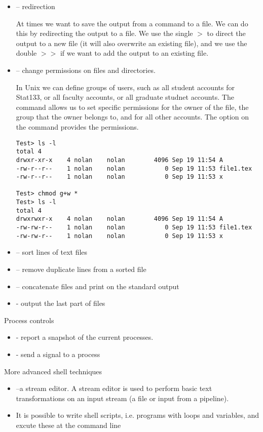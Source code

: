 \begin{itemize}
\item {} -- redirection

At times we want to save the output from a command to a file.
We can do this by redirecting the output to a file. We use the 
single $>$ to direct the output to a new file (it will also overwrite
an existing file), and we use the double $>>$ if we want to add
the output to an existing file.

\item {} -- change permissions on files and directories.

In Unix we can define groups of users, such as all student accounts for 
Stat133, or all faculty accounts, or all graduate studnet accounts. 
The  command allows us to set specific permissions for
the owner of the file, the group that the owner belongs to, and for
all other accounts.
The  option on the  command provides the permissions.

\begin{verbatim}
Test> ls -l
total 4
drwxr-xr-x    4 nolan    nolan        4096 Sep 19 11:54 A
-rw-r--r--    1 nolan    nolan           0 Sep 19 11:53 file1.tex
-rw-r--r--    1 nolan    nolan           0 Sep 19 11:53 x

Test> chmod g+w *
Test> ls -l
total 4
drwxrwxr-x    4 nolan    nolan        4096 Sep 19 11:54 A
-rw-rw-r--    1 nolan    nolan           0 Sep 19 11:53 file1.tex
-rw-rw-r--    1 nolan    nolan           0 Sep 19 11:53 x
\end{verbatim}

\item {} -- sort lines of text files
\item {} -- remove duplicate lines from a sorted file
\item {} -- concatenate files and print on the standard output
\item {} - output the last part of files
\end{itemize}

Process controls
\begin{itemize}
\item {} - report a snapshot of the current processes.
\item {} - send a signal to a process
\end{itemize}

More advanced shell techniques
\begin{itemize}
\item {} --a stream editor.  
A stream editor is used to perform basic text transformations on an 
input stream (a file or input from  a  pipeline).

\item It is possible to write shell scripts, i.e. programs with
loops and variables, and excute these at the command line
\end{itemize}
